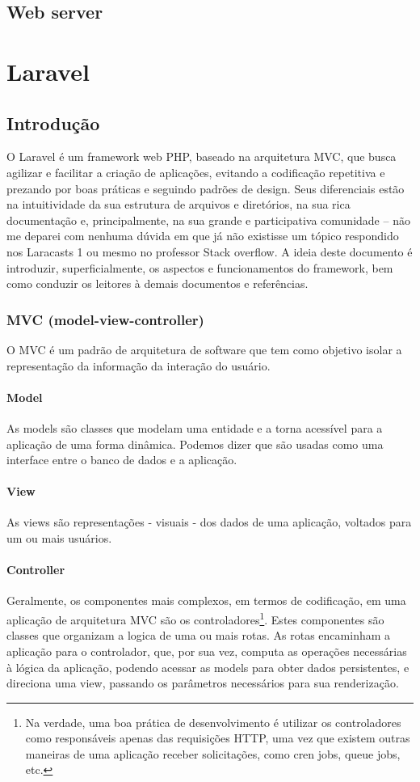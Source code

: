 \documentclass[
12pt,				%
openany,			%
twoside,			%
a4paper,			%
english,			%
french,				%
spanish,			%
brazil,				%
]{abntex2}
\begin{document}
\section{Web server}



\chapter{Laravel}
\section{Introdução}
O Laravel é um framework web PHP, baseado na arquitetura MVC, que busca agilizar e
facilitar a criação de aplicações, evitando a codificação repetitiva e prezando por boas práticas
e seguindo padrões de design. Seus diferenciais estão na intuitividade da sua estrutura de
arquivos e diretórios, na sua rica documentação e, principalmente, na sua grande e
participativa comunidade – não me deparei com nenhuma dúvida em que já não existisse um
tópico respondido nos Laracasts 1 ou mesmo no professor Stack overflow.
A ideia deste documento é introduzir, superficialmente, os aspectos e funcionamentos do
framework, bem como conduzir os leitores à demais documentos e referências.
\subsection{MVC (model-view-controller)}
O MVC é um padrão de arquitetura de software que tem como objetivo isolar a
representação da informação da interação do usuário.

\subsubsection{Model}
As models são classes que modelam uma entidade e a torna acessível para a aplicação de
uma forma dinâmica. Podemos dizer que são usadas como uma interface entre o banco de
dados e a aplicação.
\subsubsection{View}
As views são representações - visuais - dos dados de uma aplicação, voltados para um ou
mais usuários.
\subsubsection{Controller}
Geralmente, os componentes mais complexos, em termos de codificação, em uma aplicação
de arquitetura MVC são os controladores\footnote{ Na verdade, uma boa prática de desenvolvimento é utilizar os controladores como responsáveis
    apenas das requisições HTTP, uma vez que existem outras maneiras de uma aplicação receber
solicitações, como cren jobs, queue jobs, etc.}. Estes componentes são classes que organizam a
logica de uma ou mais rotas. As rotas encaminham a aplicação para o controlador, que, por
sua vez, computa as operações necessárias à lógica da aplicação, podendo acessar as models
para obter dados persistentes, e direciona uma view, passando os parâmetros necessários
para sua renderização.
\end{document}
